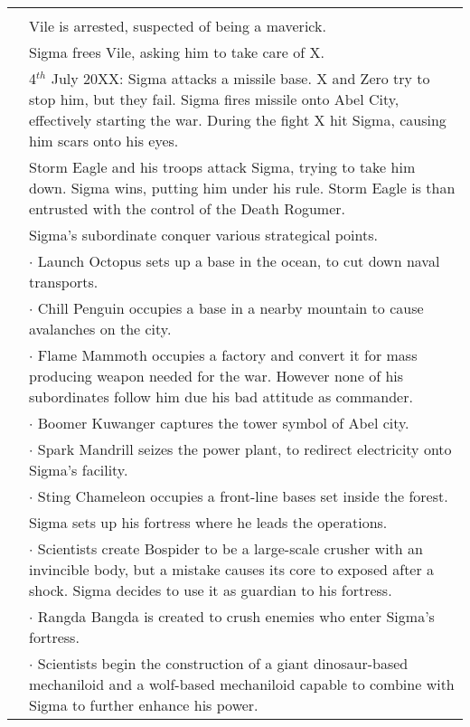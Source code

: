 \begin{tabularx}{\linewidth}{l X}
	\midrule
	\rowcolor{Aquamarine}
	\multicolumn{2}{c}{\textbf{Day of $\Sigma$ and beginning of the war}}\\
	\addlinespace[1.5ex]
	\tabdot& Vile is arrested, suspected of being a maverick.\\
	\tabdot& Sigma frees Vile, asking him to take care of X.\\
	\tabdot& 4$^{th}$ July 20XX: Sigma attacks a missile base. X and Zero try to stop him, but they fail. Sigma fires missile onto Abel City, effectively starting the war. During the fight X hit Sigma, causing him scars onto his eyes.\\
	\tabdot& Storm Eagle and his troops attack Sigma, trying to take him down. Sigma wins, putting him under his rule. Storm Eagle is than entrusted with the control of the Death Rogumer.\\
	\tabdot& Sigma's subordinate conquer various strategical points.\\
	\tabline& $\cdot$ Launch Octopus sets up a base in the ocean, to cut down naval transports.\\
	\tabline& $\cdot$ Chill Penguin occupies a base in a nearby mountain to cause avalanches on the city.\\
	\tabline& $\cdot$ Flame Mammoth occupies a factory and convert it for mass producing weapon needed for the war. However none of his subordinates follow him due his bad attitude as commander.\\
	\tabline& $\cdot$ Boomer Kuwanger captures the tower symbol of Abel city.\\
	\tabline& $\cdot$ Spark Mandrill seizes the power plant, to redirect electricity onto Sigma's facility.\\
	\tabline& $\cdot$ Sting Chameleon occupies a front-line bases set inside the forest.\\
	\tabdot& Sigma sets up his fortress where he leads the operations.\\
	\tabline& $\cdot$ Scientists create Bospider to be a large-scale crusher with an invincible body, but a mistake causes its core to exposed after a shock. Sigma decides to use it as guardian to his fortress.\\
	\tabline& $\cdot$ Rangda Bangda is created to crush enemies who enter Sigma's fortress.\\
	\tabline& $\cdot$ Scientists begin the construction of a giant dinosaur-based mechaniloid and a wolf-based mechaniloid capable to combine with Sigma to further enhance his power.\\

\end{tabularx}
